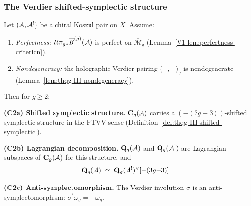 \subsubsection{The Verdier shifted-symplectic structure}

\begin{theorem}
\label{thm:thqg-III-lagrangian-polarization}
Let $(\mathcal{A}, \mathcal{A}^!)$ be a chiral Koszul pair on $X$.
Assume:
\begin{enumerate}[label=\textup{(H\arabic*)}]
\item \emph{Perfectness:} $R\pi_{g*}\overline{B}^{(g)}(\mathcal{A})$ is
 perfect on $\overline{\mathcal{M}}_g$
 \textup{(}Lemma~\textup{\ref{V1-lem:perfectness-criterion})}.
\item \emph{Nondegeneracy:} the holographic Verdier pairing
 $\langle -, - \rangle_g$ is nondegenerate
 \textup{(}Lemma~\textup{\ref{lem:thqg-III-nondegeneracy})}.
\end{enumerate}
Then for $g \ge 2$:

\smallskip\noindent
\textbf{(C2a) Shifted symplectic structure.}\;
$\mathbf{C}_g(\mathcal{A})$ carries a $(-(3g-3))$-shifted symplectic
structure in the PTVV sense
\textup{(}Definition~\textup{\ref{def:thqg-III-shifted-symplectic})}.

\smallskip\noindent
\textbf{(C2b) Lagrangian decomposition.}\;
$\mathbf{Q}_g(\mathcal{A})$ and $\mathbf{Q}_g(\mathcal{A}^!)$ are Lagrangian
subspaces of $\mathbf{C}_g(\mathcal{A})$ for this structure, and
\begin{equation}%
\mathbf{Q}_g(\cA)
\;\simeq\;
\mathbf{Q}_g(\cA^!)^{\vee}[{-(3g{-}3)}].
\end{equation}

\smallskip\noindent
\textbf{(C2c) Anti-symplectomorphism.}\;
The Verdier involution $\sigma$ is an
anti-symplectomorphism:
$\sigma^* \omega_g = -\omega_g$.
\end{theorem}

